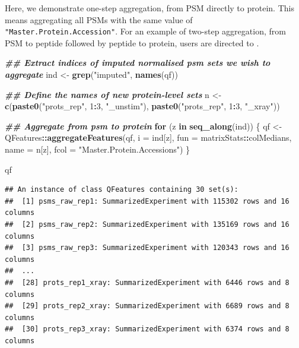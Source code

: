 \documentclass[9pt,a4paper,]{extarticle}
\newenvironment{Shaded}{\begin{snugshade}}{\end{snugshade}}
\newcommand{\AttributeTok}[1]{\textcolor[rgb]{0.13,0.29,0.53}{#1}}
\newcommand{\ControlFlowTok}[1]{\textcolor[rgb]{0.13,0.29,0.53}{\textbf{#1}}}
\newcommand{\DecValTok}[1]{\textcolor[rgb]{0.00,0.00,0.81}{#1}}
\newcommand{\DocumentationTok}[1]{\textcolor[rgb]{0.56,0.35,0.01}{\textbf{\textit{#1}}}}
\newcommand{\FunctionTok}[1]{\textcolor[rgb]{0.13,0.29,0.53}{\textbf{#1}}}
\newcommand{\NormalTok}[1]{#1}
\newcommand{\OtherTok}[1]{\textcolor[rgb]{0.56,0.35,0.01}{#1}}
\newcommand{\SpecialCharTok}[1]{\textcolor[rgb]{0.81,0.36,0.00}{\textbf{#1}}}
\newcommand{\StringTok}[1]{\textcolor[rgb]{0.31,0.60,0.02}{#1}}
\begin{document}
Here, we demonstrate one-step aggregation, from PSM directly to protein. This means
aggregating all PSMs with the same value of \texttt{"Master.Protein.Accession"}.
For an example of two-step aggregation, from PSM to peptide followed by peptide to
protein, users are directed to \citet{Hutchings2023}.

\begin{Shaded}
\begin{Highlighting}[]
\DocumentationTok{\#\# Extract indices of imputed normalised psm sets we wish to aggregate}
\NormalTok{ind }\OtherTok{\textless{}{-}} \FunctionTok{grep}\NormalTok{(}\StringTok{"imputed"}\NormalTok{, }\FunctionTok{names}\NormalTok{(qf))}

\DocumentationTok{\#\# Define the names of new protein{-}level sets}
\NormalTok{n }\OtherTok{\textless{}{-}} \FunctionTok{c}\NormalTok{(}\FunctionTok{paste0}\NormalTok{(}\StringTok{"prots\_rep"}\NormalTok{, }\DecValTok{1}\SpecialCharTok{:}\DecValTok{3}\NormalTok{, }\StringTok{"\_unstim"}\NormalTok{), }
       \FunctionTok{paste0}\NormalTok{(}\StringTok{"prots\_rep"}\NormalTok{, }\DecValTok{1}\SpecialCharTok{:}\DecValTok{3}\NormalTok{, }\StringTok{"\_xray"}\NormalTok{))}

\DocumentationTok{\#\# Aggregate from psm to protein}
\ControlFlowTok{for}\NormalTok{ (z }\ControlFlowTok{in} \FunctionTok{seq\_along}\NormalTok{(ind)) \{}
\NormalTok{  qf }\OtherTok{\textless{}{-}}\NormalTok{ QFeatures}\SpecialCharTok{::}\FunctionTok{aggregateFeatures}\NormalTok{(qf,}
                                     \AttributeTok{i =}\NormalTok{ ind[z],}
                                     \AttributeTok{fun =}\NormalTok{ matrixStats}\SpecialCharTok{::}\NormalTok{colMedians,}
                                     \AttributeTok{name =}\NormalTok{ n[z],}
                                     \AttributeTok{fcol =} \StringTok{"Master.Protein.Accessions"}\NormalTok{)}
\NormalTok{\}}

\NormalTok{qf}
\end{Highlighting}
\end{Shaded}

\begin{verbatim}
## An instance of class QFeatures containing 30 set(s):
##  [1] psms_raw_rep1: SummarizedExperiment with 115302 rows and 16 columns 
##  [2] psms_raw_rep2: SummarizedExperiment with 135169 rows and 16 columns 
##  [3] psms_raw_rep3: SummarizedExperiment with 120343 rows and 16 columns 
##  ...
##  [28] prots_rep1_xray: SummarizedExperiment with 6446 rows and 8 columns 
##  [29] prots_rep2_xray: SummarizedExperiment with 6689 rows and 8 columns 
##  [30] prots_rep3_xray: SummarizedExperiment with 6374 rows and 8 columns
\end{verbatim}
\end{document}
